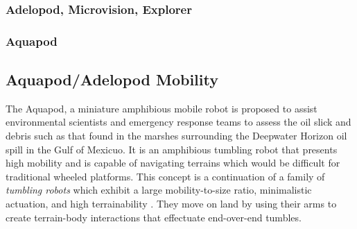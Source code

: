 \subsubsection*{Adelopod, Microvision, Explorer}
\subsubsection*{Aquapod}
\subsection{Aquapod/Adelopod Mobility}



The Aquapod, a miniature amphibious mobile robot is proposed to assist
environmental scientists and emergency response teams to assess the oil slick
and debris such as that found in the marshes surrounding the Deepwater Horizon
oil spill in the Gulf of Mexicuo. It is an amphibious tumbling robot that presents
high mobility and is capable of navigating terrains which would be difficult
for traditional wheeled platforms. This concept is a continuation of a family
of \emph{tumbling robots} which exhibit a large mobility-to-size ratio, minimalistic
actuation, and high terrainability \cite{Hemes2011, Carlson2011b}. They move on
land by using their arms to create terrain-body interactions that effectuate
end-over-end tumbles.

